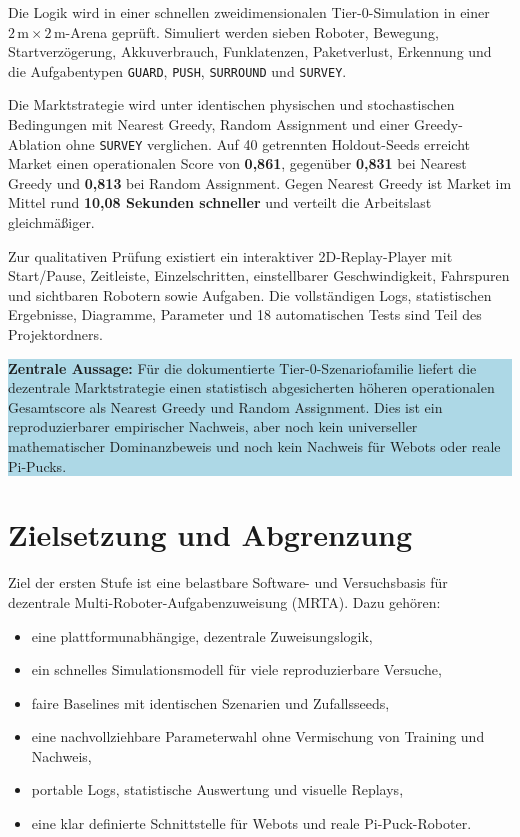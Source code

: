 \documentclass[11pt,a4paper]{article}
\newcommand{\statusbox}[1]{%
  \begin{center}
    \colorbox{lightblue}{\parbox{0.92\linewidth}{#1}}
  \end{center}
}
\begin{document}
Die Logik wird in einer schnellen zweidimensionalen Tier-0-Simulation in einer
$2\,\mathrm{m}\times2\,\mathrm{m}$-Arena geprüft. Simuliert werden sieben Roboter,
Bewegung, Startverzögerung, Akkuverbrauch, Funklatenzen, Paketverlust, Erkennung und die
Aufgabentypen \texttt{GUARD}, \texttt{PUSH}, \texttt{SURROUND} und \texttt{SURVEY}.

Die Marktstrategie wird unter identischen physischen und stochastischen Bedingungen mit
Nearest Greedy, Random Assignment und einer Greedy-Ablation ohne \texttt{SURVEY}
verglichen. Auf 40 getrennten Holdout-Seeds erreicht Market einen
operationalen Score von \textbf{0,861}, gegenüber \textbf{0,831} bei Nearest Greedy und
\textbf{0,813} bei Random Assignment. Gegen Nearest Greedy ist Market im Mittel rund
\textbf{10,08 Sekunden schneller} und verteilt die Arbeitslast gleichmäßiger.

Zur qualitativen Prüfung existiert ein interaktiver 2D-Replay-Player mit Start/Pause,
Zeitleiste, Einzelschritten, einstellbarer Geschwindigkeit, Fahrspuren und sichtbaren
Robotern sowie Aufgaben. Die vollständigen Logs, statistischen Ergebnisse, Diagramme,
Parameter und 18 automatischen Tests sind Teil des Projektordners.

\statusbox{
  \textbf{Zentrale Aussage:} Für die dokumentierte Tier-0-Szenariofamilie liefert die
  dezentrale Marktstrategie einen statistisch abgesicherten höheren operationalen
  Gesamtscore als Nearest Greedy und Random Assignment. Dies ist ein reproduzierbarer
  empirischer Nachweis, aber noch kein universeller mathematischer Dominanzbeweis und
  noch kein Nachweis für Webots oder reale Pi-Pucks.
}

\section{Zielsetzung und Abgrenzung}

Ziel der ersten Stufe ist eine belastbare Software- und Versuchsbasis für dezentrale
Multi-Roboter-Aufgabenzuweisung (MRTA). Dazu gehören:

\begin{itemize}
  \item eine plattformunabhängige, dezentrale Zuweisungslogik,
  \item ein schnelles Simulationsmodell für viele reproduzierbare Versuche,
  \item faire Baselines mit identischen Szenarien und Zufallsseeds,
  \item eine nachvollziehbare Parameterwahl ohne Vermischung von Training und Nachweis,
  \item portable Logs, statistische Auswertung und visuelle Replays,
  \item eine klar definierte Schnittstelle für Webots und reale Pi-Puck-Roboter.
\end{itemize}
\end{document}
